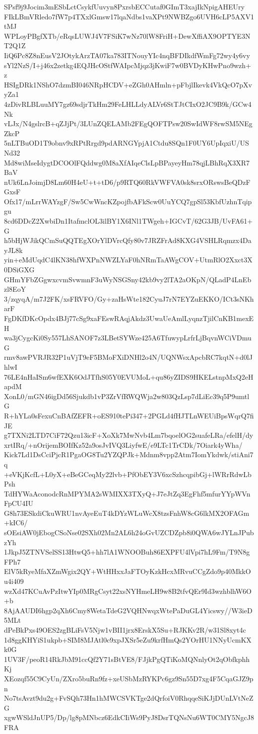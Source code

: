 SPsf9j9Jocim3mESbLctCsykfUuvyn8PxrsbECCutaf0GImT3xajIkNpigAHEUry
FIkLBmVRledo7fW7p4TXxlGmsw17lqaNdbs1vaXPt9NWBZgo6UVH6cLP5AXV1tMJ
WPLoyPBgfXTb/eRqsLUWJ4V7FSiK7wNz70lW8FriH+DewXffiAX9OPTYE3NT2Q1Z
IiQ6Pc8Z8nEusV2JOtykArzTA07ka783ITNouyYIc4nqBFDIkdfWmFg72wy4y6vy
sYl2NzS/I+j46x2zetkg4EQJHcOStfWAIpcMjqz3jKwiF7w0BVDyKHwPno9wzh+z
HSIgDRk1NShO7dzmBI046NRpHCDV+eZGh0AHmln+pFbjlIkevk4VkQcO7pXvyZa1
4zDivRLBLuuMY7gz69sdjrTkHm29FeLHLLdyALVr6StTJtCIxO2JC9B9k/GCw4Nk
vLJx/N4gslrcB+qZJjPt/3LUnZQELAMb2FEgQOFTPsw20SwIdWF8rwSM5NEgZkcP
5nLTBuOD1T9obnv9xRPtRrgd9pdARNGYpjA1Ctdu8SQn1F0UY6UpIqxiU/USNd32
Md8wiMseIdygtDCOOlFQddwg0M8aXfAIqeClsLpBPayeyHm78qjLBhRqX3XR7BaV
nUk6LnJoimjD8Lm60H4eU+t+tD6/p9RTQ60RkVWFVA0sk8srxORswsBeQDzFGxsF
Ofx17/mLrrWAYzgF/Sw5CwWncKZpojfbAFkScw0UuYCQ7gpSl53KbfUzhnTqipgu
8cd6DDcZ2XwbiDn1ItafmclOL3ilBY1X6INl1TWgeh+IGCvT/62G3JB/UvFA61+G
h5bHjWJikQCmSuQQTEgXOrYlDVrcQfy80v7JRZFrAd8KXG4VSHLRqmzx4DayJL8k
yin+eMdUqdC4lKN38hfWXPnNWZLYaF0hNRmTaAWgCOV+UtmRlO2Xxct3X0DSiGXG
GHmYFbZGgwxcvmSvwmnF3uWyNSGSny42kb9vy2lTA2aOKpN/QLadP4LnEbzl8EoY
3/zqyqA/m7J2FK/xsFRVFO/Gy+zaHsWte182CyuJ7rN7EYZuEKKO/ICt3sNKharF
FgDKfDKcOpdx4BJj77cSg9xaFEswRAqjAkdz3UwaUeAmlLyqnzTjilCnKB1mexEH
wa3jCygcKi0Sy557LhSANOF7z3LBetSYWze425A6TfuwypLrfrLjBqvnWCiVDmuG
rmv8awPVRJR32P1uVjT9eF5BMoFXiDNHl2o4N/UQNWsxApcbRC7kqtN+d0lJhlwI
76LE4nHaISm6wfEXK6OdJTfhS05Y0EVUMoL+qu86yZIDS9HKELstnpMxQ2eHapdM
XonL0/mGN46igDd56Sjukdb1vP3ZrVfRWQWja2w803QzLsp7dLiEc39q5P9umtlG
R+hYLa0sFexuCnBAfZEFR+oES910tePi347+2PGLd4fHJTLnWEUiBpsWqrQ7fiJE
g7TXNi2LTD7CiF72Qzu13icF+XoXk7MwNvb4Lm7bqoelOG2suafeLRa/efelH/dy
xrtIRq/+nOrijemBOIfKz52a9osJvIVQ3LiyfwE/e9LTc1TrCDk/7Oiark4yWha/
Kick7Ld1DsCciPjcR1PgaOG8Tu2YZQPJk+Mdnm8vpp2Atm7IomYkdwk/stiAni7q
+eVKjKcfL+L0yX+eBeGCeqMy22lvb+PfObEY3V6xcSzhcqpibGj+lWRrRdwLbPsh
TdHYWaAconodcRnMPYMA2sWMIXX3TXyQ+J7eJtZq3EgFhf5mfurYYpWVnFpCU4IU
G8h73ESkdiCkuWRU1nvAyeEuT4kDYzWLuWcX8tzsFnhW8cG6lkMX2OFAGm+kIC6/
sOEsiAW0jEbogCSoNse02SXh02Mn2AL6h24oGvUZCDZpb8i0QWA6wJYLnJPubzYh
1JkpJ5ZTNVSelSS13HtwQ5+hh7lA1WNOOBuh86EXPFU4lVpi7hL9Fm/T9N8gFPh7
ElV5kRyeMfaXZmWgix2QY+WtHHxxJaFTOyKzkHcxMRvuCCgZdo9p40MkkOu4i409
wzXd47KCuAvPzItwYIp0MRgCsyt22xsNYHmeLH9w8B2tfvQEr9Id3wzhblhW6O+b
8AjAAUDI6hgp2qXh6Cmy8WetaTdeG2VQHNwqxWtePaDuGL4Yicswy//W3ieD5MLt
dPeBkPxs49OES2zgBLiFsV5Njw1vBII1jrx8ErskX5Su+RJKKv2R/w31Sl8xyt4c
1d8ggKHYiS1ukpb+SIM8MJAtl0c9xpJXSr5eZu9krfHmQs2YOrHU1NNyUcmKXk0G
1UV3F/peoR14RkJbM91ccQf2Y71sBtVE8/FJjkPgQTiKoMQNnlyOt2qObfkphhKj
XEozqf55C9CyUn/ZXro5buRn9fz+xeUSbMzRYKPc6gz9Sn55D7xg4F5CqaGJZ9pn
No7tsAvzt9du2g+FvSQh73Hn1hMWCSVKTge2dQrfoiV0RhqqeSiKJjDUnLVtNeZG
xgwWSldJnUP5/Dp/lg8pMNbcz6EdkCIiWs9PyJ8DsrTQNsNu6WT0CMY5NgcJ8FRA
